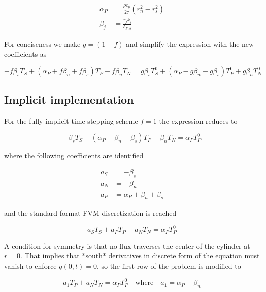 \documentclass[oneside]{textbook}
\begin{document}
\begin{equation}
\begin{aligned}
	\alpha_{P}  & = \frac{\rho{}c_{p}}{2\tau}\left(r_n^2-r_s^2\right)\\[8pt]
	\beta_{j}   & = \frac{r_jk_j}{\delta_{P,J}}
\end{aligned}
\end{equation}

For conciseness we make $g=(1-f)$ and simplify the expression with the new coefficients as

\begin{equation}
-f\beta_{s}T_S+
(\alpha_{P}+f\beta_{n}+f\beta_{s})T_P
-f\beta_{n}T_N
=
g\beta_{s}T_S^{0}+
(\alpha_{P}-g\beta_{n}-g\beta_{s})T_P^{0}+
g\beta_{n}T_N^{0}
\end{equation}

\subsection{Implicit implementation}

For the fully implicit time-stepping scheme $f=1$ the expression reduces to

\begin{equation}
-\beta_{s}T_S+
(\alpha_{P}+\beta_{n}+\beta_{s})T_P
-\beta_{n}T_N
=
\alpha_{P}T_P^{0}
\end{equation}

where the following coefficients are identified

\begin{equation}
\begin{aligned}
	a_{S} & = -\beta_{s}\\[8pt]
	a_{N} & = -\beta_{n}\\[8pt]
	a_{P} & = \alpha_{P}+\beta_{n}+\beta_{s}
\end{aligned}
\end{equation}

and the standard format FVM discretization is reached

\begin{equation}
a_ST_S + a_PT_P + a_NT_N = \alpha_{P}T_P^{0}
\end{equation}

A condition for symmetry is that no flux traverses the center of the cylinder at $r=0$. That implies that *south* derivatives in discrete form of the equation must vanish to enforce $\dot{q}(0,t)=0$, so the first row of the problem is modified to

\begin{equation}
a_1T_P + a_NT_N = \alpha_{P}T_P^{0}\quad\text{where}\quad{}a_1=\alpha_{P}+\beta_{n}
\end{equation}
\end{document}
